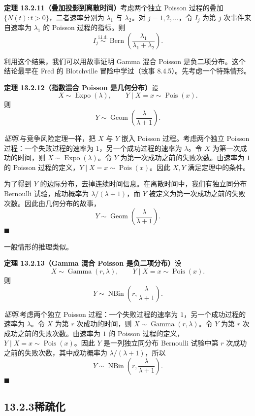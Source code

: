 \documentclass[UTF8,12pt,a4paper,fontset=fandol]{ctexart}
\begin{document}
\noindent\textbf{定理 13.2.11（叠加投影到离散时间）}\quad 考虑两个独立 Poisson 过程的叠加 $\{N(t):t>0\}$，二者速率分别为 $\lambda_1$ 与 $\lambda_2$。对 $j=1,2,\ldots$，令 $I_j$ 为第 $j$ 次事件来自速率为 $\lambda_1$ 的 Poisson 过程的指标。则
\[
  I_j\stackrel{\text{i.i.d.}}{\sim}\operatorname{Bern}\left(\frac{\lambda_1}{\lambda_1+\lambda_2}\right).
\]

利用这个结果，我们可以用故事证明 Gamma 混合 Poisson 是负二项分布。这个结论最早在 Fred 的 Blotchville 冒险中学过（故事 8.4.5）。先考虑一个特殊情形。

\noindent\textbf{定理 13.2.12（指数混合 Poisson 是几何分布）}\quad 设
\[
  X\sim\operatorname{Expo}(\lambda),\qquad Y\mid X=x\sim\operatorname{Pois}(x).
\]
则
\[
  Y\sim\operatorname{Geom}\left(\frac{\lambda}{\lambda+1}\right).
\]

\noindent\textit{证明.}\quad 与竞争风险定理一样，把 $X$ 与 $Y$ 嵌入 Poisson 过程。考虑两个独立 Poisson 过程：一个失败过程的速率为 $1$，另一个成功过程的速率为 $\lambda$。令 $X$ 为第一次成功的时间，则 $X\sim\operatorname{Expo}(\lambda)$。令 $Y$ 为第一次成功之前的失败次数。由速率为 $1$ 的 Poisson 过程的定义，$Y\mid X=x\sim\operatorname{Pois}(x)$。因此 $X,Y$ 满足定理中的条件。

为了得到 $Y$ 的边际分布，去掉连续时间信息。在离散时间中，我们有独立同分布 Bernoulli 试验，成功概率为 $\lambda/(\lambda+1)$，而 $Y$ 被定义为第一次成功之前的失败次数。因此由几何分布的故事，
\[
  Y\sim\operatorname{Geom}\left(\frac{\lambda}{\lambda+1}\right).
\]
$\blacksquare$

一般情形的推理类似。

\noindent\textbf{定理 13.2.13（Gamma 混合 Poisson 是负二项分布）}\quad 设
\[
  X\sim\operatorname{Gamma}(r,\lambda),\qquad Y\mid X=x\sim\operatorname{Pois}(x).
\]
则
\[
  Y\sim\operatorname{NBin}\left(r,\frac{\lambda}{\lambda+1}\right).
\]

\noindent\textit{证明.}\quad 考虑两个独立 Poisson 过程：一个失败过程的速率为 $1$，另一个成功过程的速率为 $\lambda$。令 $X$ 为第 $r$ 次成功的时间，则 $X\sim\operatorname{Gamma}(r,\lambda)$。令 $Y$ 为第 $r$ 次成功之前的失败次数。由速率为 $1$ 的 Poisson 过程的定义，$Y\mid X=x\sim\operatorname{Pois}(x)$。因此 $Y$ 是一列独立同分布 Bernoulli 试验中第 $r$ 次成功之前的失败次数，其中成功概率为 $\lambda/(\lambda+1)$，所以
\[
  Y\sim\operatorname{NBin}\left(r,\frac{\lambda}{\lambda+1}\right).
\]
$\blacksquare$

\subsection*{13.2.3\quad 稀疏化}
\end{document}
